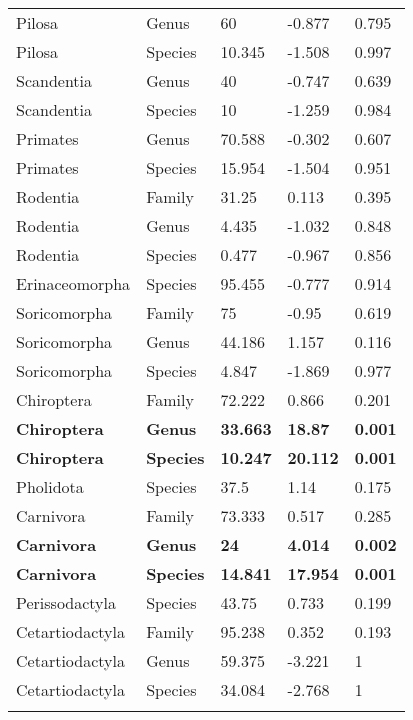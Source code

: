 \begin{longtable}{lllll}
  Pilosa & Genus & 60 & -0.877 & 0.795 \\ 
  Pilosa & Species & 10.345 & -1.508 & 0.997 \\ 
  Scandentia & Genus & 40 & -0.747 & 0.639 \\ 
  Scandentia & Species & 10 & -1.259 & 0.984 \\ 
  Primates & Genus & 70.588 & -0.302 & 0.607 \\ 
  Primates & Species & 15.954 & -1.504 & 0.951 \\ 
  Rodentia & Family & 31.25 & 0.113 & 0.395 \\ 
  Rodentia & Genus & 4.435 & -1.032 & 0.848 \\ 
  Rodentia & Species & 0.477 & -0.967 & 0.856 \\ 
  Erinaceomorpha & Species & 95.455 & -0.777 & 0.914 \\ 
  Soricomorpha & Family & 75 & -0.95 & 0.619 \\ 
  Soricomorpha & Genus & 44.186 & 1.157 & 0.116 \\ 
  Soricomorpha & Species & 4.847 & -1.869 & 0.977 \\ 
  Chiroptera & Family & 72.222 & 0.866 & 0.201 \\ 
  \textbf{Chiroptera} & \textbf{Genus} & \textbf{33.663} & \textbf{18.87} & \textbf{0.001} \\ 
  \textbf{Chiroptera} & \textbf{Species} & \textbf{10.247} & \textbf{20.112} & \textbf{0.001} \\ 
  Pholidota & Species & 37.5 & 1.14 & 0.175 \\ 
  Carnivora & Family & 73.333 & 0.517 & 0.285 \\ 
  \textbf{Carnivora} & \textbf{Genus} & \textbf{24} & \textbf{4.014} & \textbf{0.002} \\ 
  \textbf{Carnivora} & \textbf{Species} & \textbf{14.841} & \textbf{17.954} & \textbf{0.001} \\ 
  Perissodactyla & Species & 43.75 & 0.733 & 0.199 \\ 
  Cetartiodactyla & Family & 95.238 & 0.352 & 0.193 \\ 
  Cetartiodactyla & Genus & 59.375 & -3.221 & 1 \\ 
  Cetartiodactyla & Species & 34.084 & -2.768 & 1 \\ 
\hline
\label{Table_data_structure}
\end{longtable}
